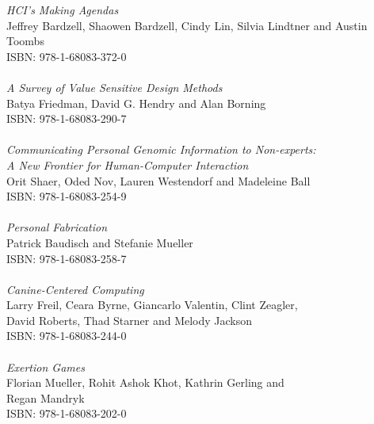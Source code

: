 \vspace{12pt}
\noindent \textit{HCI’s Making Agendas}\\
Jeffrey Bardzell, Shaowen Bardzell, Cindy Lin, Silvia Lindtner and Austin Toombs\\
ISBN: 978-1-68083-372-0\\
\\
\noindent \textit{A Survey of Value Sensitive Design Methods}\\
Batya Friedman, David G. Hendry and Alan Borning\\
ISBN: 978-1-68083-290-7\\
\\
\noindent \textit{Communicating Personal Genomic Information to Non-experts:\\ A New Frontier for Human-Computer Interaction}\\
Orit Shaer, Oded Nov, Lauren Westendorf and Madeleine Ball\\
ISBN: 978-1-68083-254-9\\
\\
\noindent \textit{Personal Fabrication}\\
Patrick Baudisch and Stefanie Mueller \\
ISBN: 978-1-68083-258-7\\
\\
\noindent \textit{Canine-Centered Computing}\\
Larry Freil, Ceara Byrne, Giancarlo Valentin, Clint Zeagler,\\ David Roberts, Thad Starner and Melody Jackson\\
ISBN: 978-1-68083-244-0\\
\\
\noindent \textit{Exertion Games}\\
Florian Mueller, Rohit Ashok Khot, Kathrin Gerling and\\ Regan Mandryk\\
ISBN: 978-1-68083-202-0